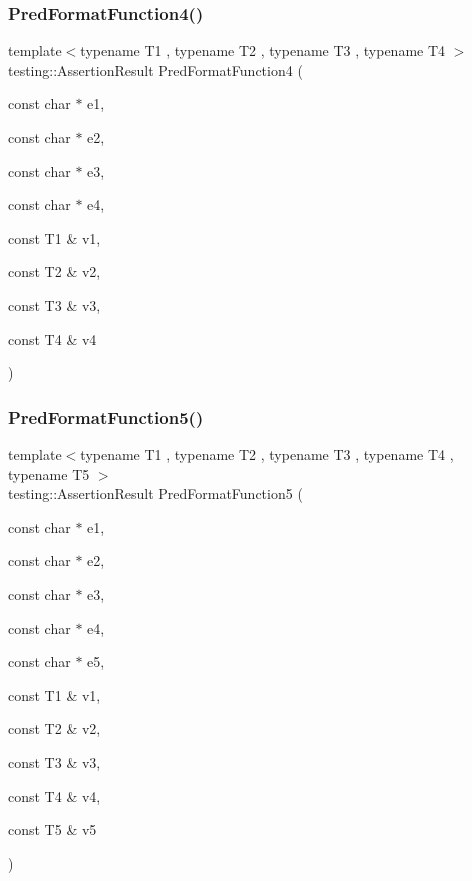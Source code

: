 \subsubsection{\texorpdfstring{PredFormatFunction4()}{PredFormatFunction4()}}
{\footnotesize\ttfamily template$<$typename T1 , typename T2 , typename T3 , typename T4 $>$ \\
testing\+::\+Assertion\+Result Pred\+Format\+Function4 (\begin{DoxyParamCaption}\item[{const char $\ast$}]{e1,  }\item[{const char $\ast$}]{e2,  }\item[{const char $\ast$}]{e3,  }\item[{const char $\ast$}]{e4,  }\item[{const T1 \&}]{v1,  }\item[{const T2 \&}]{v2,  }\item[{const T3 \&}]{v3,  }\item[{const T4 \&}]{v4 }\end{DoxyParamCaption})}

\mbox{\label{_obj__test_2lib_2googletest-master_2googletest_2test_2gtest__pred__impl__unittest_8cc_a09cbd3b6651151c3b97a890d28bdb75f}} 
\subsubsection{\texorpdfstring{PredFormatFunction5()}{PredFormatFunction5()}}
{\footnotesize\ttfamily template$<$typename T1 , typename T2 , typename T3 , typename T4 , typename T5 $>$ \\
testing\+::\+Assertion\+Result Pred\+Format\+Function5 (\begin{DoxyParamCaption}\item[{const char $\ast$}]{e1,  }\item[{const char $\ast$}]{e2,  }\item[{const char $\ast$}]{e3,  }\item[{const char $\ast$}]{e4,  }\item[{const char $\ast$}]{e5,  }\item[{const T1 \&}]{v1,  }\item[{const T2 \&}]{v2,  }\item[{const T3 \&}]{v3,  }\item[{const T4 \&}]{v4,  }\item[{const T5 \&}]{v5 }\end{DoxyParamCaption})}

